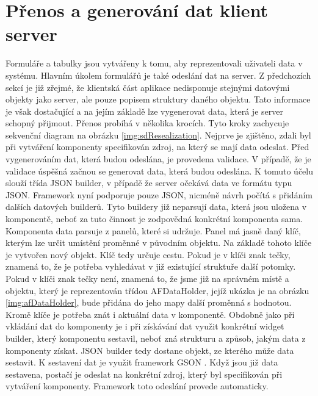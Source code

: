 \section{Přenos a generování dat klient server}
Formuláře a tabulky jsou vytvářeny k tomu, aby reprezentovali uživateli data v systému. Hlavním úkolem formulářů je také odeslání dat na server. Z předchozích sekcí je již zřejmé, že klientská část aplikace nedisponuje stejnými datovými objekty jako server, ale pouze popisem struktury daného objektu. Tato informace je však dostačující a na jejím základě lze vygenerovat data, která je server schopný přijmout. Přenos probíhá v několika krocích. Tyto kroky zachycuje sekvenční diagram na obrázku \ref{img:sdResealization}. Nejprve je zjištěno, zdali byl při vytváření komponenty specifikován zdroj, na který se mají data odeslat. Před vygenerováním dat, která budou odeslána, je provedena validace. V případě, že je validace úspěšná začnou se generovat data, která budou odeslána. K tomuto účelu slouží třída JSON builder, v případě že server očekává data ve formátu typu JSON. Framework nyní podporuje pouze JSON, nicméně návrh počítá s přidáním dalších datových builderů. Tyto buildery již neparsují data, která jsou uložena v komponentě, neboť za tuto činnost je zodpovědná konkrétní komponenta sama. Komponenta data parsuje z panelů, které si udržuje. Panel má jasně daný klíč, kterým lze určit umístění proměnné v původním objektu. Na základě tohoto klíče je vytvořen nový objekt. Klíč tedy určuje cestu. Pokud je v klíči znak tečky, znamená to, že je potřeba vyhledávat v již existující struktuře další potomky. Pokud v klíči znak tečky není, znamená to, že jsme již na správném místě a objektu, který je reprezentován třídou AFDataHolder, jejíž ukázka je na obrázku \ref{img:afDataHolder}, bude přidána do jeho mapy další proměnná s hodnotou. Kromě klíče je potřeba znát i aktuální data v komponentě. Obdobně jako při vkládání dat do komponenty je i při získávání dat využit konkrétní widget builder, který komponentu sestavil, neboť zná strukturu a způsob, jakým data z komponenty získat. JSON builder tedy dostane objekt, ze kterého může data sestavit. K sestavení dat je využit framework GSON \cite{gson}. Když jsou již data sestavena, postačí je odeslat na konkrétní zdroj, který byl specifikován při vytváření komponenty. Framework toto odeslání provede automaticky.

